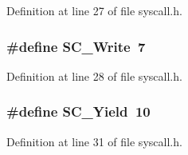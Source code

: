 Definition at line 27 of file syscall.\+h.

\subsubsection[{S\+C\+\_\+\+Write}]{\setlength{\rightskip}{0pt plus 5cm}\#define S\+C\+\_\+\+Write~7}\label{syscall_8h_abda43217eee0d3ad38d5a9dc378e173d}


Definition at line 28 of file syscall.\+h.

\subsubsection[{S\+C\+\_\+\+Yield}]{\setlength{\rightskip}{0pt plus 5cm}\#define S\+C\+\_\+\+Yield~10}\label{syscall_8h_ac13724ee06fcba144c277c482cf4dd2a}


Definition at line 31 of file syscall.\+h.

